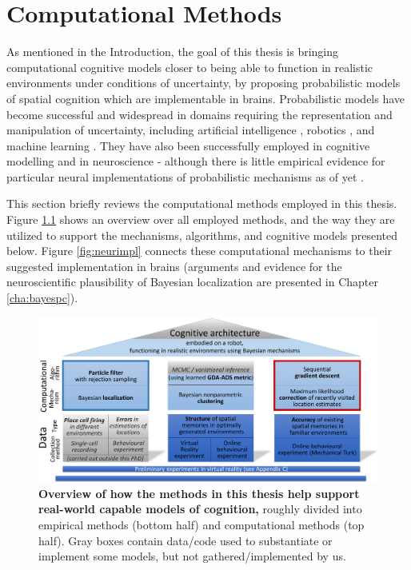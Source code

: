 \chapter{Computational Methods}
\label{cha:methods}

As mentioned in the Introduction, the goal of this thesis is bringing computational cognitive models closer to being able to function in realistic environments under conditions of uncertainty, by proposing probabilistic models of spatial cognition which are implementable in brains. Probabilistic models have become successful and widespread in domains requiring the representation and manipulation of uncertainty, including artificial intelligence \citep{russell2009ai}, robotics \citep{thrun2005probabilistic}, and machine learning \citep{bishop2006pattern}. They have also been successfully employed in cognitive modelling  \citep{chater2010bayesian} and in neuroscience \citep{knill2004bayesian} - although there is little empirical evidence for particular neural implementations of probabilistic mechanisms as of yet \citep{griffiths2008bayesian, vilares2011bayesian, pouget2013probabilistic}. 

This section briefly reviews the computational methods employed in this thesis. Figure \ref{fig:methods} shows an overview over all employed methods, and the way they are utilized to support the mechanisms, algorithms, and cognitive models presented below. Figure \ref{fig:neurimpl} connects these computational mechanisms to their suggested implementation in brains (arguments and evidence for the neuroscientific plausibility of Bayesian localization are presented in Chapter \ref{cha:bayespc}). 

\begin{figure}[h]
	\centering
	\includegraphics[width=\textwidth]{img/methodsfigure2}
	\caption[Overview of how the methods in this thesis help support real-world capable models of cognition]{\textbf{Overview of how the methods in this thesis help support real-world capable models of cognition,} roughly divided into empirical methods (bottom half) and computational methods (top half). Gray boxes contain data/code used to substantiate or implement some models, but not gathered/implemented by us.} 
	\label{fig:methods}
\end{figure}

